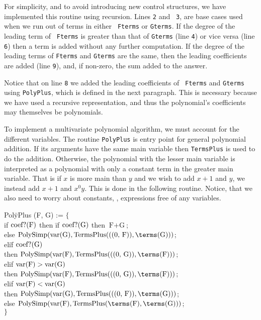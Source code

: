 For simplicity, and to avoid introducing new control structures, we
have implemented this routine using recursion.  Lines {\tt 2} and {\tt
3}, are base cases used when we run out of terms in either {\tt
Fterms} or {\tt Gterms}.  If the degree of the leading term of {\tt
Fterms} is greater than that of {\tt Gterms} (line {\tt 4}) or vice
versa (line {\tt 6}) then a term is added without any further
computation.  If the degree of the leading terms of {\tt Fterms} and
{\tt Gterms} are the same, then the leading coefficients are added
(line {\tt 9}), and, if non-zero, the sum added to the answer.

Notice that on line {\tt 8} we added the leading coefficients of {\tt
Fterms} and {\tt Gterms} using {\tt PolyPlus}, which is defined in the
next paragraph.  This is necessary because we have used a recursive
representation, and thus the polynomial's coefficients may themselves
be polynomials.

To implement a multivariate polynomial algorithm, we must account for
the different variables.  The routine {\tt PolyPlus} is entry
point for general polynomial addition.  If its arguments have the same
main variable then {\tt TermsPlus} is used to do the addition.
Otherwise, the polynomial with the lesser main variable is interpreted
as a polynomial with only a constant term in the greater main
variable.  That is if $x$ is more main than $y$ and we wish to add
$x+1$ and $y$, we instead add $x+1$ and $x^0 y$.  This is done in the
following routine.  Notice, that we also need to worry about
constants, \ie, expressions free of any variables. 

\begindsacode
Pol\=yPlus (F, G) := $\{$ \\
\>if $\mathop{\rm coef?}\nolimits(\mbox{F})$ then \=if $\mathop{\rm coef?}\nolimits(\mbox{G})$ then $\mbox{F}+\mbox{G}$; \\
\>\>else $\mbox{PolySimp}(\var(\mbox{G}), \mbox{TermsPlus}(\mbox{((0, F))}, \terms(\mbox{G})))$; \\
\>eli\=f $\mathop{\rm coef?}\nolimits(\mbox{G})$\\
\>\> then $\mbox{PolySimp}(\var(\mbox{F}), \mbox{TermsPlus}(\mbox{((0, G))}, \terms(\mbox{F})))$; \\
\>elif $\mathop{\rm var}\nolimits(\mbox{F}) > \mathop{\rm var}\nolimits(\mbox{G})$ \\
\>\>then $\mbox{PolySimp}(\var(\mbox{F}), \mbox{TermsPlus}(\mbox{((0, G))}, \terms(\mbox{F})))$; \\
\>elif $\mathop{\rm var}\nolimits(\mbox{F}) < \mathop{\rm var}\nolimits(\mbox{G})$ \\
\>\>then $\mbox{PolySimp}(\var(\mbox{G}), \mbox{TermsPlus}(\mbox{((0, \mbox{F}))}, \terms(\mbox{G})))$; \\
\>else $\mbox{PolySimp}(\var(\mbox{F}), \mbox{TermsPlus}(\terms(\mbox{F}), \terms(\mbox{G})))$;\\
\>$\}$
\enddsacode

